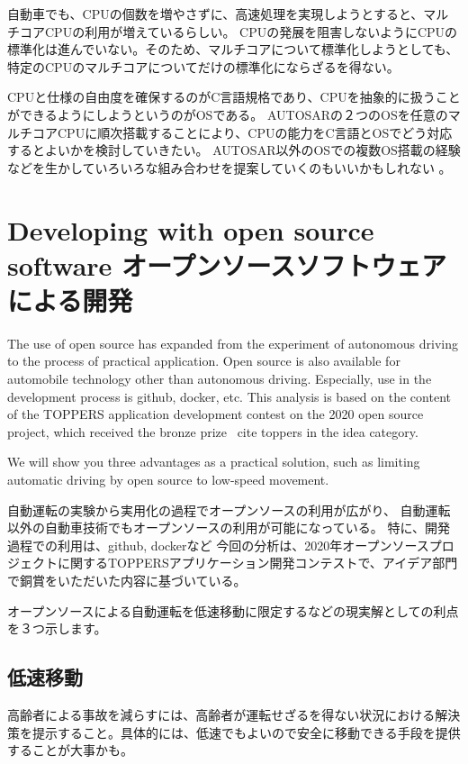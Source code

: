 \documentclass[twocolumn]{article} %
\begin{document}
自動車でも、CPUの個数を増やさずに、高速処理を実現しようとすると、マルチコアCPUの利用が増えているらしい。
CPUの発展を阻害しないようにCPUの標準化は進んでいない。そのため、マルチコアについて標準化しようとしても、特定のCPUのマルチコアについてだけの標準化にならざるを得ない。

CPUと仕様の自由度を確保するのがC言語規格であり、CPUを抽象的に扱うことができるようにしようというのがOSである。
AUTOSARの２つのOSを任意のマルチコアCPUに順次搭載することにより、CPUの能力をC言語とOSでどう対応するとよいかを検討していきたい\cite{multicore}。
AUTOSAR以外のOSでの複数OS搭載の経験などを生かしていろいろな組み合わせを提案していくのもいいかもしれない\cite{multicore2019} 。



\section{Developing with open source software オープンソースソフトウェアによる開発}
The use of open source has expanded from the experiment of autonomous driving to the process of practical application.
Open source is also available for automobile technology other than autonomous driving.
Especially, use in the development process is github, docker, etc.
This analysis is based on the content of the TOPPERS application development contest on the 2020 open source project, which received the bronze prize \ cite {toppers} in the idea category.

We will show you three advantages as a practical solution, such as limiting automatic driving by open source to low-speed movement.

自動運転の実験から実用化の過程でオープンソースの利用が広がり、
自動運転以外の自動車技術でもオープンソースの利用が可能になっている。
特に、開発過程での利用は、github, dockerなど
今回の分析は、2020年オープンソースプロジェクトに関するTOPPERSアプリケーション開発コンテストで、アイデア部門で銅賞\cite{toppers}をいただいた内容に基づいている。

オープンソースによる自動運転を低速移動に限定するなどの現実解としての利点を３つ示します。


\subsection{低速移動}

高齢者による事故を減らすには、高齢者が運転せざるを得ない状況における解決策を提示すること。具体的には、低速でもよいので安全に移動できる手段を提供することが大事かも。
\cite{yamaha1}
\cite{yamaha2}
\cite{yamaha3}
\cite{yamaha4}
\cite{yamaha5}
\cite{yamaha6}
\end{document}

